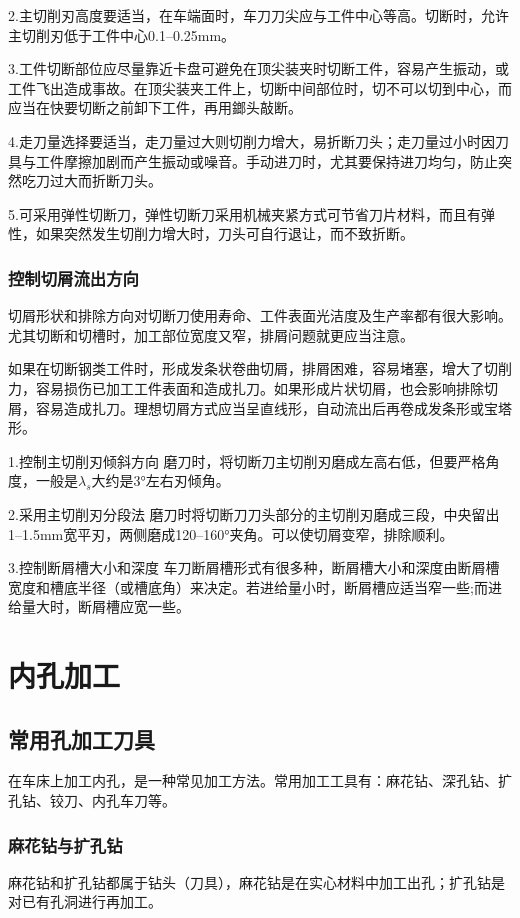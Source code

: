 \documentclass{ctexbook}
\begin{document}
2.主切削刃高度要适当，在车端面时，车刀刀尖应与工件中心等高。切断时，允许主切削刃低于工件中心0.1--0.25mm。

3.工件切断部位应尽量靠近卡盘可避免在顶尖装夹时切断工件，容易产生振动，或工件飞出造成事故。在顶尖装夹工件上，切断中间部位时，切不可以切到中心，而应当在快要切断之前卸下工件，再用鎯头敲断。

4.走刀量选择要适当，走刀量过大则切削力增大，易折断刀头；走刀量过小时因刀具与工件摩擦加剧而产生振动或噪音。手动进刀时，尤其要保持进刀均匀，防止突然吃刀过大而折断刀头。

5.可采用弹性切断刀，弹性切断刀采用机械夹紧方式可节省刀片材料，而且有弹性，如果突然发生切削力增大时，刀头可自行退让，而不致折断。
\subsubsection{控制切屑流出方向}
切屑形状和排除方向对切断刀使用寿命、工件表面光洁度及生产率都有很大影响。尤其切断和切槽时，加工部位宽度又窄，排屑问题就更应当注意。

如果在切断钢类工件时，形成发条状卷曲切屑，排屑困难，容易堵塞，增大了切削力，容易损伤已加工工件表面和造成扎刀。如果形成片状切屑，也会影响排除切屑，容易造成扎刀。理想切屑方式应当呈直线形，自动流出后再卷成发条形或宝塔形。

1.控制主切削刃倾斜方向 磨刀时，将切断刀主切削刃磨成左高右低，但要严格角度，一般是$\lambda_s$大约是3°左右刃倾角。

2.采用主切削刃分段法 磨刀时将切断刀刀头部分的主切削刃磨成三段，中央留出1--1.5mm宽平刃，两侧磨成120--160°夹角。可以使切屑变窄，排除顺利。

3.控制断屑槽大小和深度 车刀断屑槽形式有很多种，断屑槽大小和深度由断屑槽宽度和槽底半径（或槽底角）来决定。若进给量小时，断屑槽应适当窄一些;而进给量大时，断屑槽应宽一些。
\section{内孔加工}
\subsection{常用孔加工刀具}
在车床上加工内孔，是一种常见加工方法。常用加工工具有：麻花钻、深孔钻、扩孔钻、铰刀、内孔车刀等。
\subsubsection{麻花钻与扩孔钻}
麻花钻和扩孔钻都属于钻头（刀具），麻花钻是在实心材料中加工出孔；扩孔钻是对已有孔洞进行再加工。
\end{document}
